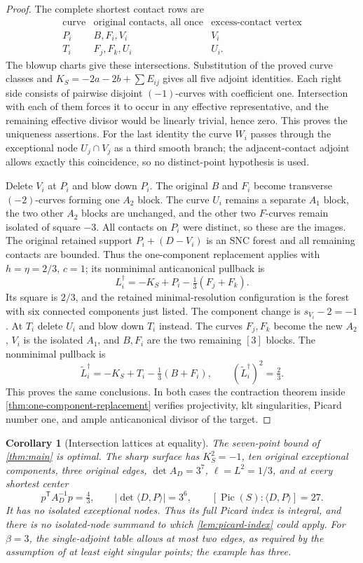 \documentclass[11pt,reqno]{amsart}
\newtheorem{corollary}[corollary]{Corollary}
\theoremstyle{definition}
\theoremstyle{remark}
\DeclareMathOperator{\Pic}{Pic}
\numberwithin{equation}{section}
\begin{document}
\begin{proof}
The complete shortest contact rows are
\[
\begin{array}{c|c|c}
\text{curve}&\text{original contacts, all once}&\text{excess-contact vertex}\\\hline
P_i&B,F_i,V_i&V_i\\
T_i&F_j,F_k,U_i&U_i.
\end{array}
\]
The blowup charts give these intersections.
Substitution of the proved curve classes and
$K_S=-2a-2b+\sum E_{ij}$ gives all five adjoint identities.
Each right side consists of pairwise disjoint $(-1)$-curves with
coefficient one. Intersection with each of them forces it to occur in
any effective representative, and the remaining effective divisor would
be linearly trivial, hence zero. This proves the uniqueness assertions.
For the last identity the curve $W_i$ passes through the exceptional node
$U_j\cap V_j$ as a third smooth branch; the adjacent-contact adjoint
allows exactly this coincidence, so no distinct-point hypothesis is used.

Delete $V_i$ at $P_i$ and blow down $P_i$. The original $B$ and $F_i$
become transverse $(-2)$-curves forming one $A_2$ block. The curve $U_i$
remains a separate $A_1$ block, the two other $A_2$ blocks are unchanged,
and the other two $F$-curves remain isolated of square $-3$.
All contacts on $P_i$ were distinct, so these are the images.
The original retained support $P_i+(D-V_i)$ is an SNC forest and all
remaining contacts are bounded. Thus the one-component replacement
applies with $h=\eta=2/3$, $c=1$; its nonminimal anticanonical pullback is
\[
 L_i^\dagger=-K_S+P_i-\tfrac13(F_j+F_k).
\]
Its square is $2/3$, and the retained minimal-resolution configuration
is the forest with six connected components just listed. The component
change is $s_{V_i}-2=-1$.
At $T_i$ delete $U_i$ and blow down $T_i$ instead. The curves $F_j,F_k$
become the new $A_2$, $V_i$ is the isolated $A_1$, and $B,F_i$ are the two
remaining $[3]$ blocks. The nonminimal pullback is
\[
 \widetilde L_i^\dagger=-K_S+T_i-\tfrac13(B+F_i),
 \qquad (\widetilde L_i^\dagger)^2=\tfrac23.
\]
This proves the same conclusions. In both cases the contraction theorem
inside \cref{thm:one-component-replacement} verifies projectivity, klt singularities,
Picard number one, and ample anticanonical divisor of the target.

\end{proof}

\begin{corollary}[Intersection lattices at equality]
\label{cor:equality-lattice}
The seven-point bound of \cref{thm:main} is optimal.
The sharp surface has $K_S^2=-1$, ten original exceptional components,
three original edges, $\det A_D=3^7$, $\ell=L^2=1/3$, and at every shortest
center
\[
 p^{\mathsf T}A_D^{-1}p=\tfrac43,\qquad
 |\det\langle D,P\rangle|=3^6,\qquad
 [\Pic(S):\langle D,P\rangle]=27.
\]
It has no isolated exceptional nodes. Thus its full Picard index is integral, and there is no isolated-node
summand to which \cref{lem:picard-index} could apply.
For $\beta=3$, the single-adjoint table allows at most two edges,
as required by the assumption of at least eight singular points;
the example has three.
\end{corollary}
\end{document}
